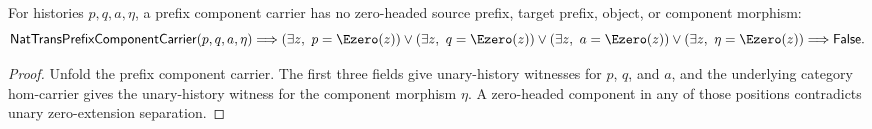 \begin{theorem}
\label{thm:nattrans-prefix-component-carrier-zero-headed-component-absurd}
For histories $p,q,a,\eta$, a prefix component carrier has no zero-headed
source prefix, target prefix, object, or component morphism:
$$
\mathsf{NatTransPrefixComponentCarrier}(p,q,a,\eta)
\Longrightarrow
\left(
\exists z,\ p=\Ezero(z)
\right)
\lor
\left(
\exists z,\ q=\Ezero(z)
\right)
\lor
\left(
\exists z,\ a=\Ezero(z)
\right)
\lor
\left(
\exists z,\ \eta=\Ezero(z)
\right)
\Longrightarrow
\mathsf{False}.
$$
\end{theorem}
\begin{proof}
Unfold the prefix component carrier. The first three fields give unary-history
witnesses for $p$, $q$, and $a$, and the underlying category hom-carrier gives
the unary-history witness for the component morphism $\eta$. A zero-headed
component in any of those positions contradicts unary zero-extension
separation.
\end{proof}



